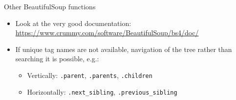 \begin{frame}[fragile]{Other BeautifulSoup functions}
\begin{itemize}
	\item Look at the very good documentation: \url{https://www.crummy.com/software/BeautifulSoup/bs4/doc/}
	\item If unique tag names are not available, navigation of the tree rather than searching it is possible, e.g.:
	\begin{itemize}
		\item Vertically: \verb!.parent!, \verb!.parents!, \verb!.children!
		\item Horizontally: \verb!.next_sibling!, \verb!.previous_sibling!
	\end{itemize}
\end{itemize}
\end{frame}